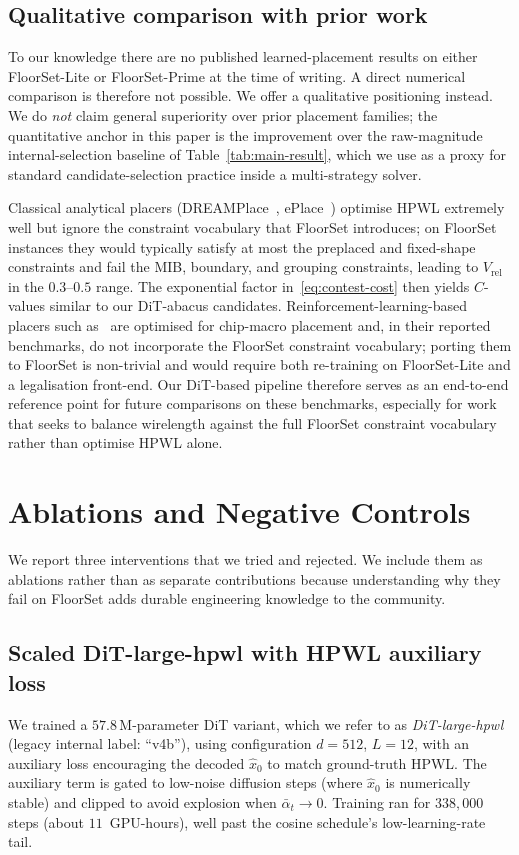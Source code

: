 \documentclass[nolineno]{ieeeaccess}
\begin{document}
\subsection{Qualitative comparison with prior work}
\label{sec:exp-comparison}

To our knowledge there are no published learned-placement results on
either FloorSet-Lite or FloorSet-Prime at the time of writing. A
direct numerical comparison is therefore not possible. We offer a
qualitative positioning instead. We do \emph{not} claim general
superiority over prior placement families; the quantitative anchor in
this paper is the improvement over the raw-magnitude
internal-selection baseline of Table~\ref{tab:main-result}, which we
use as a proxy for standard candidate-selection practice inside a
multi-strategy solver.

Classical analytical placers (DREAMPlace~\cite{lin2019dreamplace},
ePlace~\cite{lu2015eplace}) optimise HPWL extremely well but ignore
the constraint vocabulary that FloorSet introduces; on FloorSet
instances they would typically satisfy at most the preplaced and
fixed-shape constraints and fail the MIB, boundary, and grouping
constraints, leading to $V_{\text{rel}}$ in the $0.3$--$0.5$ range. The
exponential factor in~\eqref{eq:contest-cost} then yields $C$-values
similar to our DiT-abacus candidates. Reinforcement-learning-based
placers such as~\cite{mirhoseini2021graph,lai2022maskplace,
lai2023chipformer} are optimised for chip-macro placement and, in
their reported benchmarks, do not incorporate the FloorSet constraint
vocabulary; porting them to FloorSet is non-trivial and would require
both re-training on FloorSet-Lite and a legalisation front-end. Our
DiT-based pipeline therefore serves as an end-to-end reference point
for future comparisons on these benchmarks, especially for work that
seeks to balance wirelength against the full FloorSet constraint
vocabulary rather than optimise HPWL alone.

\section{Ablations and Negative Controls}
\label{sec:ablations}

We report three interventions that we tried and rejected. We include
them as ablations rather than as separate contributions because
understanding why they fail on FloorSet adds durable engineering
knowledge to the community.

\subsection{Scaled DiT-large-hpwl with HPWL auxiliary loss}
\label{sec:ablation-v4b}
We trained a $57.8\,\text{M}$-parameter DiT variant, which we refer to
as \emph{DiT-large-hpwl} (legacy internal label: ``v4b''), using
configuration $d{=}512$, $L{=}12$,
with an auxiliary loss encouraging the decoded $\hat{x}_0$ to match
ground-truth HPWL. The auxiliary term is gated to low-noise diffusion
steps (where $\hat{x}_0$ is numerically stable) and clipped to avoid
explosion when $\bar{\alpha}_t\to 0$. Training ran for $338{,}000$
steps (about $11$~GPU-hours), well past the cosine schedule's
low-learning-rate tail.
\end{document}
